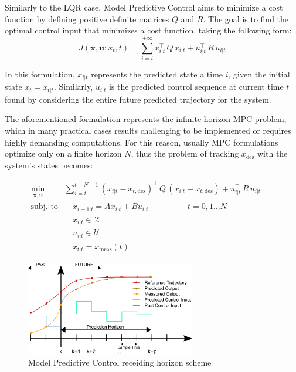 \documentclass[a4paper,12pt,oneside]{book}
\begin{document}
\bigskip
Similarly to the LQR case, Model Predictive Control aims to minimize a cost function by defining positive definite matrices $Q$ and $R$. 
The goal is to find the optimal control input that minimizes a cost function, taking the following form:
\begin{equation}
    J(\boldsymbol{x}, \boldsymbol{u}; x_t, t) = \sum_{i=t} ^{+ \infty} x_{i|t}^\top \, Q \, x_{i|t} + u_{i|t}^\top \, R \, u_{i|t}
\end{equation}

In this formulation, $x_{i|t}$ represents the predicted state a time $i$, given the initial state $x_t = x_{t|t}$. 
Similarly, $u_{i|t}$ is the predicted control sequence at current time $t$ found by considering the entire future predicted trajectory for the system.

\bigskip
The aforementioned formulation represents the infinite horizon MPC problem, which in many practical cases results challenging to be implemented or requires highly demanding computations.
For this reason, usually MPC formulations optimize only on a finite horizon $N$, thus the problem of tracking $x_{\text{des}}$ with the system's states becomes:

\begin{equation}
\begin{alignedat}{2}
	\min_{\substack{\boldsymbol{x}, \boldsymbol{u}}}\quad & \sum_{i=t}^{t+N-1} (x_{i|t} - x_{t,\text{des}}) ^\top \, Q \, (x_{i|t} - x_{t,\text{des}}) +  u_{i|t}^\top \, R \, u_{i|t} &&   \\
	\text{subj. to} & \quad x_{i+1|t}  = A x_{i|t} + B u_{i|t}   \hspace{2cm} t = 0, 1 \ldots N &&  \\
     &\quad x_{i|t} \in \mathcal{X} && \\
    &\quad u_{i|t} \in \mathcal{U} && \\
    &\quad x_{t|t} = x_{\text{meas}}(t) && 
\end{alignedat}
\label{MPC1}
\end{equation}

\begin{figure}
	\centering
	\includegraphics[width=0.66\textwidth]{MPC.png}
	\caption{Model Predictive Control receiding horizon scheme}
	\label{image:mpc}
\end{figure}
\end{document}
